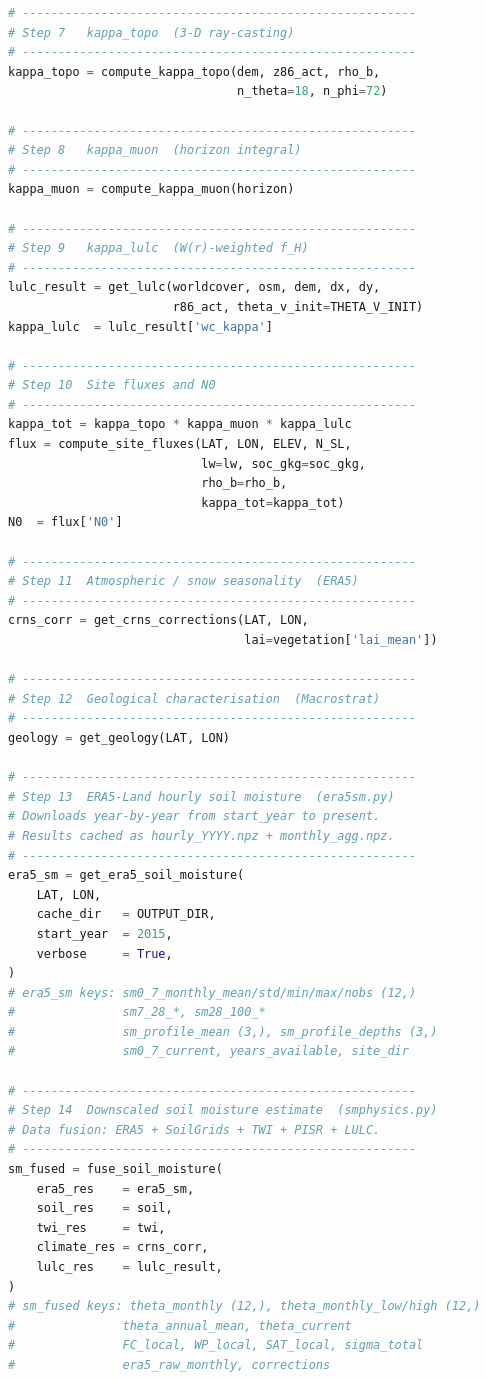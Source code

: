 \begin{lstlisting}[language=Python, caption={CRNS site characterization
  pipeline — top-level pseudocode (main.py).},
  label={lst:pipeline}]
# -------------------------------------------------------
# Step 7   kappa_topo  (3-D ray-casting)
# -------------------------------------------------------
kappa_topo = compute_kappa_topo(dem, z86_act, rho_b,
                                n_theta=18, n_phi=72)

# -------------------------------------------------------
# Step 8   kappa_muon  (horizon integral)
# -------------------------------------------------------
kappa_muon = compute_kappa_muon(horizon)

# -------------------------------------------------------
# Step 9   kappa_lulc  (W(r)-weighted f_H)
# -------------------------------------------------------
lulc_result = get_lulc(worldcover, osm, dem, dx, dy,
                       r86_act, theta_v_init=THETA_V_INIT)
kappa_lulc  = lulc_result['wc_kappa']

# -------------------------------------------------------
# Step 10  Site fluxes and N0
# -------------------------------------------------------
kappa_tot = kappa_topo * kappa_muon * kappa_lulc
flux = compute_site_fluxes(LAT, LON, ELEV, N_SL,
                           lw=lw, soc_gkg=soc_gkg,
                           rho_b=rho_b,
                           kappa_tot=kappa_tot)
N0  = flux['N0']

# -------------------------------------------------------
# Step 11  Atmospheric / snow seasonality  (ERA5)
# -------------------------------------------------------
crns_corr = get_crns_corrections(LAT, LON,
                                 lai=vegetation['lai_mean'])

# -------------------------------------------------------
# Step 12  Geological characterisation  (Macrostrat)
# -------------------------------------------------------
geology = get_geology(LAT, LON)

# -------------------------------------------------------
# Step 13  ERA5-Land hourly soil moisture  (era5sm.py)
# Downloads year-by-year from start_year to present.
# Results cached as hourly_YYYY.npz + monthly_agg.npz.
# -------------------------------------------------------
era5_sm = get_era5_soil_moisture(
    LAT, LON,
    cache_dir   = OUTPUT_DIR,
    start_year  = 2015,
    verbose     = True,
)
# era5_sm keys: sm0_7_monthly_mean/std/min/max/nobs (12,)
#               sm7_28_*, sm28_100_*
#               sm_profile_mean (3,), sm_profile_depths (3,)
#               sm0_7_current, years_available, site_dir

# -------------------------------------------------------
# Step 14  Downscaled soil moisture estimate  (smphysics.py)
# Data fusion: ERA5 + SoilGrids + TWI + PISR + LULC.
# -------------------------------------------------------
sm_fused = fuse_soil_moisture(
    era5_res    = era5_sm,
    soil_res    = soil,
    twi_res     = twi,
    climate_res = crns_corr,
    lulc_res    = lulc_result,
)
# sm_fused keys: theta_monthly (12,), theta_monthly_low/high (12,)
#               theta_annual_mean, theta_current
#               FC_local, WP_local, SAT_local, sigma_total
#               era5_raw_monthly, corrections


\end{lstlisting}
